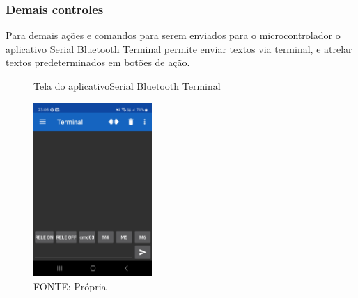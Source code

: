 \subsubsection{Demais controles}

Para demais ações e comandos para serem enviados para o microcontrolador
o aplicativo Serial Bluetooth Terminal permite enviar textos via terminal,
e atrelar textos predeterminados em botões de ação.

\begin{figure}[ht]
	\centering
	\caption{Tela do aplicativoSerial Bluetooth Terminal}
	\includegraphics[width=0.40\textwidth]{figures/serialbluetoothterminal}
    \caption*{FONTE: Própria}
	\label{serialbluetoothterminal_tela}
\end{figure}
